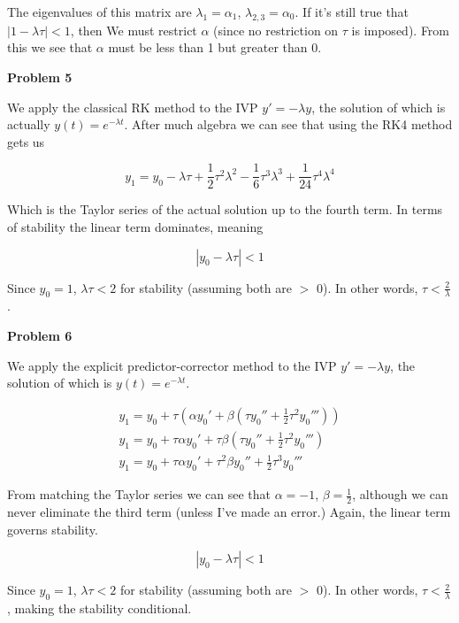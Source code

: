 \documentclass[a4paper,12pt]{article}
\begin{document}
The eigenvalues of this matrix are $\lambda_1=\alpha_1$, $\lambda_{2,3}=\alpha_0$. If it's still true that $|1-\lambda \tau|<1$, then We must restrict $\alpha$ (since no restriction on $\tau$ is imposed). From this we see that $\alpha$ must be less than 1 but greater than 0. 
\bigskip

{\bf Problem  5}
\smallskip

We apply the classical RK method to the IVP $y'=-\lambda y$, the solution of which is actually $y(t)=e^{-\lambda t}$. After much algebra we can see that using the RK4 method gets us

\begin{equation*}
y_1=y_0-\lambda \tau + \frac{1}{2} \tau^2 \lambda ^2 - \frac{1}{6} \tau^3 \lambda ^3 + \frac{1}{24} \tau^4 \lambda ^4
\end{equation*}

Which is the Taylor series of the actual solution up to the fourth term. In terms of stability the linear term dominates, meaning 

\begin{equation*}
|y_0-\lambda \tau| < 1
\end{equation*}

Since $y_0=1$, $\lambda \tau < 2$ for stability (assuming both are $>$ 0). In other words, $\tau<\frac{2}{\lambda}$. 
\bigskip

{\bf Problem 6}
\smallskip

We apply the explicit predictor-corrector method to the IVP $y'=-\lambda y$, the solution of which is $y(t)=e^{-\lambda t}$. 

\begin{eqnarray*}
y_1=y_0+\tau(\alpha y_0'+\beta(\tau y_0''+\frac{1}{2}\tau^2 y_0''')) \\
y_1=y_0+\tau \alpha y_0'+\tau \beta(\tau y_0''+\frac{1}{2} \tau^2 y_0''') \\
y_1=y_0+\tau \alpha y_0'+\tau^2 \beta y_0'' + \frac{1}{2} \tau^3 y_0'''
\end{eqnarray*}

From matching the Taylor series we can see that $\alpha=-1$, $\beta=\frac{1}{2}$, although we can never eliminate the third term (unless I've made an error.) Again, the linear term governs stability. 

\begin{equation*}
|y_0-\lambda \tau| < 1
\end{equation*}

Since $y_0=1$, $\lambda \tau < 2$ for stability (assuming both are $>$ 0). In other words, $\tau<\frac{2}{\lambda}$, making the stability conditional. 
\bigskip
\end{document}
